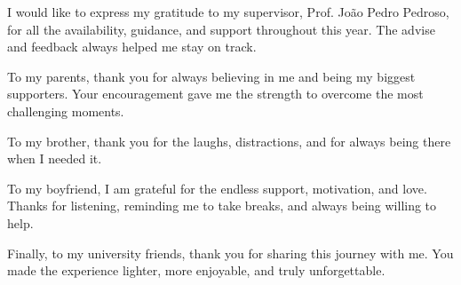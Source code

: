 



\begin{acknowledgements}

I would like to express my gratitude to my supervisor, Prof. João Pedro Pedroso, for all the availability, guidance, and support throughout this year. The advise and feedback always helped me stay on track.

To my parents, thank you for always believing in me and being my biggest supporters. Your encouragement gave me the strength to overcome the most challenging moments.

To my brother, thank you for the laughs, distractions, and for always being there when I needed it.

To my boyfriend, I am grateful for the endless support, motivation, and love. Thanks for listening, reminding me to take breaks, and always being willing to help.

Finally, to my university friends, thank you for sharing this journey with me. You made the experience lighter, more enjoyable, and truly unforgettable.

\end{acknowledgements}


